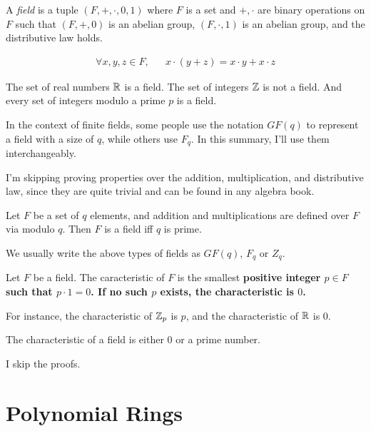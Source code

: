 \begin{definition}
    A \emph{field} is a tuple $(F,+,\cdot,0,1)$ where $F$ is a set and $+,\cdot$ are binary operations on $F$
    such that $(F,+,0)$ is an abelian group, $(F,\cdot,1)$ is an abelian group, and the distributive law holds.

    \begin{align*}
        \forall x,y,z\in F, && x\cdot(y+z) = x\cdot y + x\cdot z
    \end{align*}
\end{definition}

\begin{example}
    The set of real numbers $\mathbb{R}$ is a field. 
    The set of integers $\mathbb{Z}$ is not a field.
    And every set of integers modulo a prime $p$ is a field.
\end{example}

In the context of finite fields, 
some people use the notation $GF(q)$ to represent a field with a 
size of $q$, while others use $F_q$. In this summary, I'll use them interchangeably.


I'm skipping proving properties over the addition, multiplication, and distributive law,
since they are quite trivial and can be found in any algebra book.

\begin{theorem}
    Let $F$ be a set of $q$ elements, and addition and multiplications are defined 
    over $F$ via modulo $q$. Then $F$ is a field iff $q$ is prime.
\end{theorem}

We usually write the above types of fields as $GF(q)$, $F_q$ or $Z_q$.

\begin{definition}
    Let $F$ be a field. The caracteristic of $F$ is the smallest \bf{positive} integer 
    $p\in F$ such that $p\cdot 1=0$. 
    If no such $p$ exists, the characteristic is $0$.
\end{definition}

For instance, the characteristic of $\mathbb{Z}_p$ is $p$, and the characteristic of $\mathbb{R}$ is $0$.

\begin{theorem}
The characteristic of a field is either $0$ or a prime number.
\end{theorem}

I skip the proofs.

\section{Polynomial Rings}

